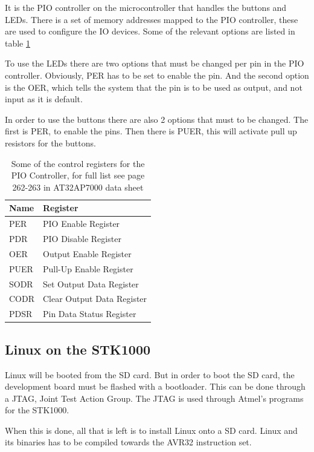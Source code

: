 \documentclass[12pt,a4paper,final]{report}
\numberwithin{equation}{section}
\numberwithin{table}{section}
\numberwithin{figure}{section}
\begin{document}
It is the PIO controller on the microcontroller that handles the buttons and LEDs. There is a set of memory addresses mapped to the PIO controller, these are used to configure the IO devices. Some of the relevant options are listed in table \ref{tab:pioregisters}

To use the LEDs there are two options that must be changed per pin in the PIO controller. Obviously, PER has to be set to enable the pin. And the second option is the OER, which tells the system that the pin is to be used as output, and not input as it is default.

In order to use the buttons there are also 2 options that must to be changed. The first is PER, to enable the pins. Then there is PUER, this will activate pull up resistors for the buttons.

\begin{table}[H]
\centering
\begin{tabular}{|l|l|}
\hline
Name & Register\\
\hline
PER & PIO Enable Register\\
PDR & PIO Disable Register\\
OER & Output Enable Register\\
PUER & Pull-Up Enable Register\\
SODR & Set Output Data Register\\
CODR & Clear Output Data Register\\
PDSR & Pin Data Status Register\\
\hline
\end{tabular}
\caption{Some of the control registers for the PIO Controller, for full list see page 262-263 in AT32AP7000 data sheet\cite{at32ap7000}}
\label{tab:pioregisters}
\end{table}


\subsection{Linux on the STK1000}
\label{sec:linuxstk1000}

Linux will be booted from the SD card. But in order to boot the SD card, the development board must be flashed with a bootloader. This can be done through a JTAG, Joint Test Action Group. The JTAG is used through Atmel’s programs for the STK1000.

When this is done, all that is left is to install Linux onto a SD card. Linux and its binaries has to be compiled towards the AVR32 instruction set. 
\end{document}
